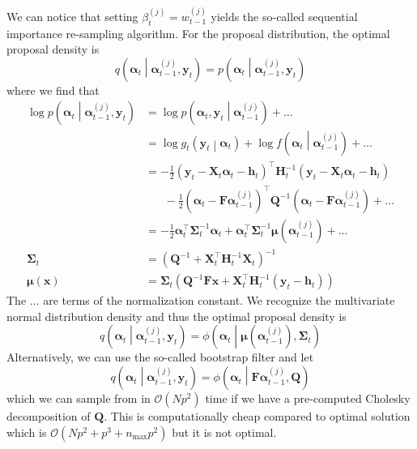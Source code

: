 \documentclass[notitlepage]{article}
\renewcommand{\vec}[1]{\bm{#1}}
\newcommand{\mat}[1]{\mathbf{#1}}
\newcommand{\Lparen}[1]{\left( #1\right)}
\newcommand{\Cond}[2]{ #1 \middle\vert  #2}
\newcommand{\optor}[2]{#1\Lparen{#2}}
\newcommand{\optorC}[3]{\optor{#1}{\Cond{#2}{#3}}}
\newcommand{\pdensC}[2]{\optorC{p}{#1}{#2}}
\newcommand{\normaldC}[3]{\optorC{\phi}{#1}{#2,#3}}
\newcommand{\IDC}[2]{\optorC{q}{#1}{#2}}
\newcommand{\partic}[3]{#1_{#2}^{\Lparen{#3}}}
\newcommand{\bigO}[1]{\mathcal{O}\Lparen{#1}}
\newcommand{\dimState}{p}
\newcommand{\nPart}{N}
\newcommand{\nMax}{n_{\text{max}}}
\begin{document}
%  
We can notice that setting $\partic\beta tj = \partic w{t-1}j$ yields the 
so-called sequential importance 
re-sampling algorithm. For the proposal distribution, the optimal proposal density is%
%
$$
\IDC{\vec\alpha_t}{\partic{\vec\alpha}{t-1}j, \vec y_t} 
	= \pdensC{\vec\alpha_t}{\partic{\vec\alpha}{t-1}j, \vec y_t}
$$%
% 
where we find that %
%
\begin{align}
\log \pdensC{\vec\alpha_t}{\partic{\vec\alpha}{t-1}j, \vec y_t} 
	&=\log \pdensC{\vec\alpha_t, \vec y_t}{\partic{\vec\alpha}{t-1}j} + \dots 
	\nonumber\\
	&=\log \optorC{g_t}{\vec y_t}{\vec{\alpha}_t} + 
		\log\optorC{f}{\vec\alpha_t}{\partic{\vec\alpha}{t-1}j} + \dots 
		\nonumber\\
	&= -\frac 12\Lparen{\vec y_t - \mat X_t\vec \alpha_t - \vec h_t}^\top 
		\mat H^{-1}_t\Lparen{\vec y_t - \mat X_t\vec\alpha_t - \vec h_t} 
		\nonumber\\
		&\hspace{20pt}-\frac 12\Lparen{\vec\alpha_t - \mat F\partic{\vec\alpha}{t-1}j}^\top\mat Q^{-1}
		\Lparen{\vec\alpha_t - \mat F\partic{\vec\alpha}{t-1}j} + \dots 
		\nonumber\\
	&= - \frac 12\vec\alpha_t^\top\mat\Sigma^{-1}_t\vec\alpha_t
		+\vec\alpha_t^\top\mat \Sigma^{-1}_t\vec\mu\Lparen{\partic{\vec\alpha}{t-1}j} + \dots \nonumber\\
\mat\Sigma_t &= \Lparen{\mat Q^{-1} + \mat X_t^\top\mat H_t^{-1}\mat X_t}^{-1} 
	\label{eq:fwNormProCovar}\\
\vec\mu(\vec x) &= \mat\Sigma_t\Lparen{
	\mat Q^{-1}\mat F\vec x + \mat X^\top_t\mat H_t^{-1} (\vec y_t - \vec h_t)}
	\label{eq:fwNormProMean}
\end{align}%
% 
The $\dots$ are terms of the normalization constant. We recognize the multivariate normal distribution density and thus the optimal proposal density is %
%
$$\IDC{\vec\alpha_t}{\partic{\vec\alpha}{t-1}j, \vec y_t}  
	= \normaldC{\vec\alpha_t}{\vec\mu(\partic{\vec\alpha}{t-1}j)}{\mat\Sigma_t}
$$%
%
Alternatively, we can use the so-called bootstrap filter and let%
%
\begin{equation}\label{eq:bootFW}
	\IDC{\vec{\alpha}_t}{\partic{\vec{\alpha}}{t-1}{j}, \vec{y}_t} = %
		\normaldC{\vec\alpha_t}{\mat{F}\partic{\vec{\alpha}}{t-1}{j}}{\mat{Q}}
\end{equation}%
%
which we can sample from in $\bigO{\nPart \dimState^2}$ time if we have a pre-computed Cholesky 
decomposition of $\mat{Q}$. This is computationally cheap 
compared to optimal solution which is $\bigO{\nPart \dimState^2  + \dimState^3 + \nMax \dimState^2}$ but it is not optimal.
\end{document}
